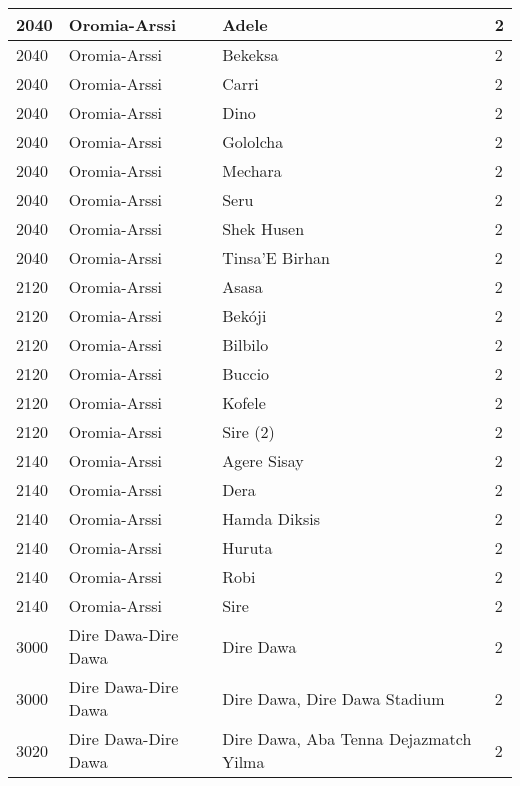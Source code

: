 \documentclass[12pt,a4paper,openbib,titlepage]{report}
\begin{document}
\begin{longtable}{|p{2cm}|p{6.5cm}|p{8cm}|p{1.5cm}|}
\hline 
\rule[-1ex]{0pt}{2.5ex} 2040 & Oromia-Arssi & Adele & 2 \\ 
\hline 
\rule[-1ex]{0pt}{2.5ex} 2040 & Oromia-Arssi & Bekeksa & 2 \\ 
\hline 
\rule[-1ex]{0pt}{2.5ex} 2040 & Oromia-Arssi & Carri & 2 \\ 
\hline 
\rule[-1ex]{0pt}{2.5ex} 2040 & Oromia-Arssi & Dino & 2 \\ 
\hline 
\rule[-1ex]{0pt}{2.5ex} 2040 & Oromia-Arssi & Gololcha & 2 \\ 
\hline 
\rule[-1ex]{0pt}{2.5ex} 2040 & Oromia-Arssi & Mechara & 2 \\ 
\hline 
\rule[-1ex]{0pt}{2.5ex} 2040 & Oromia-Arssi & Seru & 2 \\ 
\hline 
\rule[-1ex]{0pt}{2.5ex} 2040 & Oromia-Arssi & Shek Husen & 2 \\ 
\hline 
\rule[-1ex]{0pt}{2.5ex} 2040 & Oromia-Arssi & Tinsa'E Birhan & 2 \\ 
\hline 
\rule[-1ex]{0pt}{2.5ex} 2120 & Oromia-Arssi & Asasa & 2 \\ 
\hline 
\rule[-1ex]{0pt}{2.5ex} 2120 & Oromia-Arssi & Bek\'oji & 2 \\ 
\hline 
\rule[-1ex]{0pt}{2.5ex} 2120 & Oromia-Arssi & Bilbilo & 2 \\ 
\hline 
\rule[-1ex]{0pt}{2.5ex} 2120 & Oromia-Arssi & Buccio & 2 \\ 
\hline 
\rule[-1ex]{0pt}{2.5ex} 2120 & Oromia-Arssi & Kofele & 2 \\  
\hline 
\rule[-1ex]{0pt}{2.5ex} 2120 & Oromia-Arssi & Sire (2) & 2 \\ 
\hline 
\rule[-1ex]{0pt}{2.5ex} 2140 & Oromia-Arssi & Agere Sisay & 2 \\ 
\hline 
\rule[-1ex]{0pt}{2.5ex} 2140 & Oromia-Arssi & Dera & 2 \\ 
\hline 
\rule[-1ex]{0pt}{2.5ex} 2140 & Oromia-Arssi & Hamda Diksis & 2 \\ 
\hline 
\rule[-1ex]{0pt}{2.5ex} 2140 & Oromia-Arssi & Huruta & 2 \\ 
\hline 
\rule[-1ex]{0pt}{2.5ex} 2140 & Oromia-Arssi & Robi & 2 \\ 
\hline 
\rule[-1ex]{0pt}{2.5ex} 2140 & Oromia-Arssi & Sire & 2 \\ 
\hline 
\rule[-1ex]{0pt}{2.5ex} 3000 & Dire Dawa-Dire Dawa & Dire Dawa & 2 \\
\hline 
\rule[-1ex]{0pt}{2.5ex} 3000 & Dire Dawa-Dire Dawa & Dire Dawa, Dire Dawa Stadium & 2 \\
\hline 
\rule[-1ex]{0pt}{2.5ex} 3020 & Dire Dawa-Dire Dawa & Dire Dawa, Aba Tenna Dejazmatch Yilma & 2 \\

\end{longtable}
\end{document}
